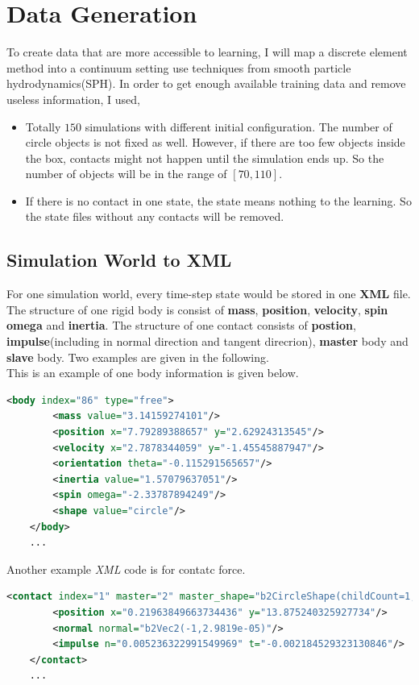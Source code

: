 \section{Data Generation}
To create data that are more accessible to learning, I will map a discrete element method into a continuum setting use techniques from smooth particle hydrodynamics(SPH). In order to get enough available training data and remove useless information, I used,
\begin{itemize}
    \item Totally $150$ simulations with different initial configuration. The number of circle objects is not fixed as well. However, if there are too few objects inside the box, contacts might not happen until the simulation ends up. So the number of objects will be in the range of $[70, 110]$.
    \item If there is no contact in one state, the state means nothing to the learning. So the state files without any contacts will be removed.
\end{itemize}

\subsection{Simulation World to XML}
For one simulation world, every time-step state would be stored in one \textbf{XML} file. The structure of one rigid body is consist of \textbf{mass}, \textbf{position}, \textbf{velocity}, \textbf{spin omega} and \textbf{inertia}. The structure of one contact consists of \textbf{postion}, \textbf{impulse}(including in normal direction and tangent direcrion), \textbf{master} body and \textbf{slave} body. Two examples are given in the following.\\

This is an example of one body information is given below.
\begin{lstlisting}[language=XML]
    <body index="86" type="free">
        <mass value="3.14159274101"/>
        <position x="7.79289388657" y="2.62924313545"/>
        <velocity x="2.7878344059" y="-1.45545887947"/>
        <orientation theta="-0.115291565657"/>
        <inertia value="1.57079637051"/>
        <spin omega="-2.33787894249"/>
        <shape value="circle"/>
    </body>
    ...
\end{lstlisting}
Another example \textit{XML} code is for contatc force.
\begin{lstlisting}[language=XML]
    <contact index="1" master="2" master_shape="b2CircleShape(childCount=1, pos=b2Vec2(0,0), radius=1.2000000476837158, type=0,)" slave="97" slave_shape="b2CircleShape(childCount=1, pos=b2Vec2(0,0), radius=1.2000000476837158, type=0, )">
        <position x="0.21963849663734436" y="13.875240325927734"/>
        <normal normal="b2Vec2(-1,2.9819e-05)"/>
        <impulse n="0.005236322991549969" t="-0.002184529323130846"/>
    </contact>
    ...
\end{lstlisting}

